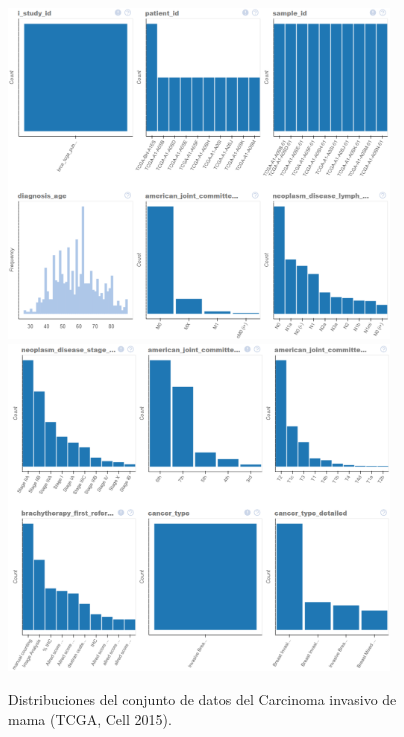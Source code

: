 \newpage
\begin{figure}
	\caption{Distribuciones del conjunto de datos del Carcinoma invasivo de mama (TCGA, Cell 2015).}\label{fig:foobar}
	\includegraphics[width=0.9\textwidth]{NOTEBOOK/IMAGES_EDA/1}
	\includegraphics[width=0.9\textwidth]{NOTEBOOK/IMAGES_EDA/2}
\end{figure}

